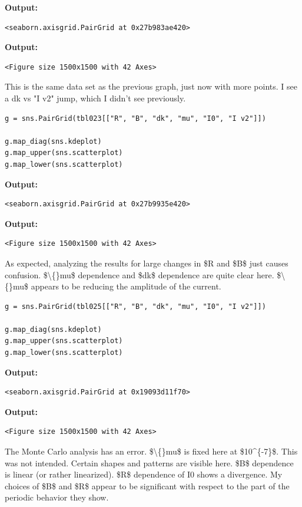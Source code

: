 \documentclass{article}
\begin{document}
\textbf{Output:}\begin{verbatim}
<seaborn.axisgrid.PairGrid at 0x27b983ae420>
\end{verbatim}

\textbf{Output:}\begin{verbatim}
<Figure size 1500x1500 with 42 Axes>
\end{verbatim}

This is the same data set as the previous graph, just now with more points. I see a dk vs "I v2" jump, which I didn't see previously.

\begin{lstlisting}
g = sns.PairGrid(tbl023[["R", "B", "dk", "mu", "I0", "I v2"]])

g.map_diag(sns.kdeplot)
g.map_upper(sns.scatterplot)
g.map_lower(sns.scatterplot)\end{lstlisting}

\textbf{Output:}\begin{verbatim}
<seaborn.axisgrid.PairGrid at 0x27b9935e420>
\end{verbatim}

\textbf{Output:}\begin{verbatim}
<Figure size 1500x1500 with 42 Axes>
\end{verbatim}

As expected, analyzing the results for large changes in \$R and \$B\$ just causes confusion. \$\textbackslash\{\}mu\$ dependence and \$dk\$ dependence are quite clear here. \$\textbackslash\{\}mu\$ appears to be reducing the amplitude of the current. 

\begin{lstlisting}
g = sns.PairGrid(tbl025[["R", "B", "dk", "mu", "I0", "I v2"]])

g.map_diag(sns.kdeplot)
g.map_upper(sns.scatterplot)
g.map_lower(sns.scatterplot)\end{lstlisting}

\textbf{Output:}\begin{verbatim}
<seaborn.axisgrid.PairGrid at 0x19093d11f70>
\end{verbatim}

\textbf{Output:}\begin{verbatim}
<Figure size 1500x1500 with 42 Axes>
\end{verbatim}

The Monte Carlo analysis has an error. \$\textbackslash\{\}mu\$ is fixed here at \$10\textasciicircum{}\{-7\}\$. This was not intended. Certain shapes and patterns are visible here. \$B\$ dependence is linear (or rather linearized). \$R\$ dependence of I0 shows a divergence. My choices of \$B\$ and \$R\$ appear to be significant with respect to the part of the periodic behavior they show. 
\end{document}
